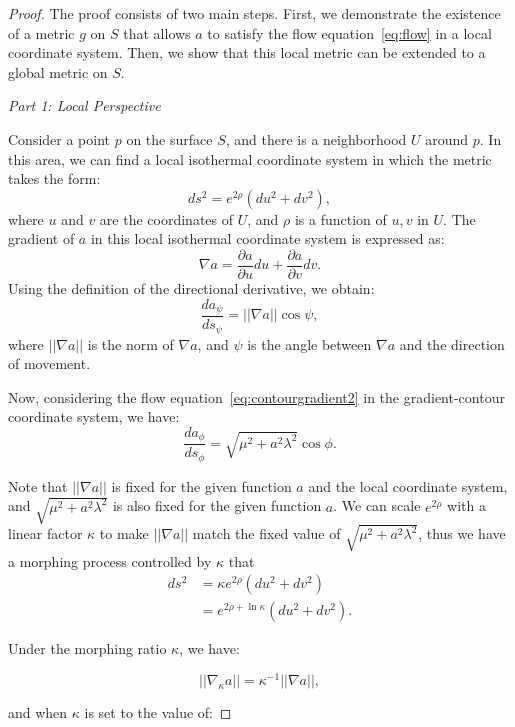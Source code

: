\begin{proof}
    The proof consists of two main steps. First, we demonstrate the existence of a metric \( g \) on \( S \) that allows \( a \) to satisfy the flow equation~\eqref{eq:flow} in a local coordinate system. Then, we show that this local metric can be extended to a global metric on \( S \).

    \emph{Part 1: Local Perspective}

    Consider a point \( p \) on the surface \( S \), and there is a neighborhood \( U \) around \( p \).
    In this area, we can find a local isothermal coordinate system in which the metric takes the form:
    \[ ds^2 = e^{2\rho}(du^2 + dv^2), \]
    where \( u \) and \( v \) are the coordinates of \( U \), and \( \rho \) is a function of \( u, v \) in \( U \).
    The gradient of \( a \) in this local isothermal coordinate system is expressed as:
    \[ \nabla a = \frac{\partial a}{\partial u} du + \frac{\partial a}{\partial v} dv. \]
    Using the definition of the directional derivative, we obtain:
    \[ \frac{da_{\psi}}{ds_{\psi}} = ||\nabla a|| \cos \psi, \]
    where \( ||\nabla a|| \) is the norm of \( \nabla a \), and \( \psi \) is the angle between \( \nabla a \) and the direction of movement.

    Now, considering the flow equation~\ref{eq:contourgradient2} in the gradient-contour coordinate system, we have:
    \[ \frac{da_{\phi}}{ds_{\phi}} = \sqrt{\mu^2 + a^2 \lambda^2} \cos \phi. \]

    Note that \( ||\nabla a|| \) is fixed for the given function \( a \) and the local coordinate system, and \( \sqrt{\mu^2 + a^2 \lambda^2} \) is also fixed for the given function \( a \).
    We can scale \( e^{2\rho} \) with a linear factor \( \kappa \) to make \( ||\nabla a|| \) match the fixed value of \( \sqrt{\mu^2 + a^2 \lambda^2} \),
    thus we have a morphing process controlled by \( \kappa \) that
    \begin{align}
    ds^2 &= \kappa e^{2 \rho}(du^2 + dv^2)\label{eq:morphing} \\
         &= e^{2 \rho + \ln \kappa}(du^2 + dv^2).
    \end{align}

    Under the morphing ratio \( \kappa \), we have:

    \begin{equation}
      ||\nabla_\kappa a|| = \kappa^{-1} ||\nabla a||,
    \end{equation}

    and when \( \kappa \) is set to the value of:


\end{proof}
